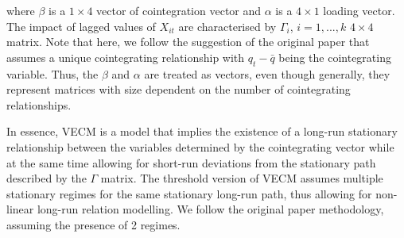\documentclass[a4paper,10pt]{article}
\begin{document}
where $\beta$ is a $1 \times 4$ vector of cointegration vector and $\alpha$ is a $4 \times 1$ loading vector. The impact of lagged values of $X_{it}$ are characterised by $\Gamma_i$, $i = 1,...,k$ $4 \times 4$ matrix. Note that here, we follow the suggestion of the original paper that assumes a unique cointegrating relationship with $q_t - \bar{q}$ being the cointegrating variable. Thus, the $\beta$ and $\alpha$ are treated as vectors, even though generally, they represent matrices with size dependent on the number of cointegrating relationships. 

In essence, VECM is a model that implies the existence of a long-run stationary relationship between the variables determined by the cointegrating vector while at the same time allowing for short-run deviations from the stationary path described by the $\Gamma$ matrix. The threshold version of VECM assumes multiple stationary regimes for the same stationary long-run path, thus allowing for non-linear long-run relation modelling. We follow the original paper methodology, assuming the presence of 2 regimes. 
\end{document}
